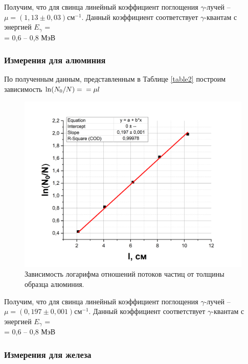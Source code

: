 \documentclass[a4paper,12pt]{article}
\begin{document}
Получим, что для свинца линейный коэффициент поглощения $\gamma$-лучей -- \\ $\mu = (1,13 \pm 0,03) см^{-1}$. Данный коэффициент соответствует $\gamma$-квантам с энергией $E_{\gamma}$ = \\ = 0,6 -- 0,8 МэВ 



\newpage

\subsubsection*{Измерения для алюминия}

По полученным данным, представленным в Таблице \ref{table2} построим зависимость $\ln(N_0/N) = \\ =\mu l$

\begin{figure}[h]
	\includegraphics[width=\linewidth]{graph2(Al)} 
	\caption{Зависимость логарифма отношений потоков частиц от толщины образца алюминия.}
	\label{Al}
\end{figure}

Получим, что для свинца линейный коэффициент поглощения $\gamma$-лучей -- \\ $\mu = (0,197 \pm 0,001) см^{-1}$. Данный коэффициент соответствует $\gamma$-квантам с энергией $E_{\gamma}$ = \\ = 0,6 -- 0,8 МэВ 

\newpage

\subsubsection*{Измерения для железа}
\end{document}

